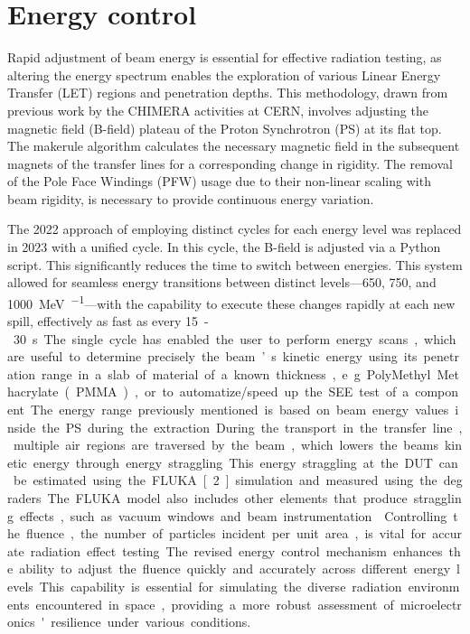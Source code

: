 \documentclass[a4paper,
               biblatex,     %
               ]{jacow}
\begin{document}
\section{Energy control}

Rapid adjustment of beam energy is essential for effective radiation testing, as altering the energy spectrum enables the exploration of various Linear Energy Transfer (LET) regions and penetration depths. This methodology, drawn from previous work by the CHIMERA activities at CERN, involves adjusting the magnetic field (B-field) plateau of the Proton Synchrotron (PS) at its flat top. The makerule algorithm calculates the necessary magnetic field in the subsequent magnets of the transfer lines for a corresponding change in rigidity. The removal of the Pole Face Windings (PFW) usage due to their non-linear scaling with beam rigidity, is necessary to provide continuous energy variation.

The 2022 approach of employing distinct cycles for each energy level was replaced in 2023 with a unified cycle. In this cycle, the B-field is adjusted via a Python script. This significantly reduces the time to switch between energies. This system allowed for seamless energy transitions between distinct levels—\SI{650}{}, \SI{750}{}, and \SI{1000}{\mega\electronvolt\per\nucleon}—with the capability to execute these changes rapidly at each new spill, effectively as fast as every \SI{15}-\SI{30}{\second}.

The single cycle has enabled the user to perform energy scans, which are useful to determine precisely the beam’s kinetic energy using its penetration range in a slab of material of a known thickness, e.g. PolyMethyl Methacrylate (PMMA), or to automatize/speed up the SEE test of a component. The energy range previously mentioned is based on beam energy values inside the PS during the extraction. During the transport in the transfer line, multiple air regions are traversed by the beam, which lowers the beams kinetic energy through energy straggling. This energy straggling at the DUT can be estimated using the FLUKA [2] simulation and measured using the degraders. The FLUKA model also includes other elements that produce straggling effects, such as vacuum windows and beam instrumentation. \cite{noauthor_hearts_nodate}

Controlling the fluence, the number of particles incident per unit area, is vital for accurate radiation effect testing. The revised energy control mechanism enhances the ability to adjust the fluence quickly and accurately across different energy levels. This capability is essential for simulating the diverse radiation environments encountered in space, providing a more robust assessment of microelectronics' resilience under various conditions.
\end{document}
